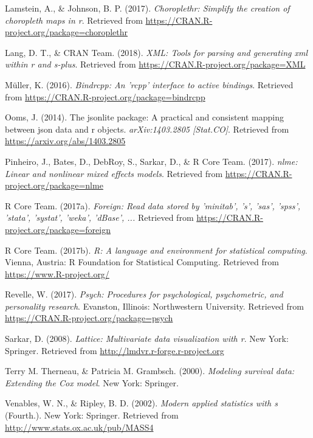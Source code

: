 \documentclass[english,man]{apa6}
\theoremstyle{definition}
\theoremstyle{definition}
\theoremstyle{definition}
\theoremstyle{remark}
\begin{document}
\hypertarget{ref-R-choroplethr}{}
Lamstein, A., \& Johnson, B. P. (2017). \emph{Choroplethr: Simplify the
creation of choropleth maps in r}. Retrieved from
\url{https://CRAN.R-project.org/package=choroplethr}

\hypertarget{ref-R-XML}{}
Lang, D. T., \& CRAN Team. (2018). \emph{XML: Tools for parsing and
generating xml within r and s-plus}. Retrieved from
\url{https://CRAN.R-project.org/package=XML}

\hypertarget{ref-R-bindrcpp}{}
Müller, K. (2016). \emph{Bindrcpp: An 'rcpp' interface to active
bindings}. Retrieved from
\url{https://CRAN.R-project.org/package=bindrcpp}

\hypertarget{ref-R-jsonlite}{}
Ooms, J. (2014). The jsonlite package: A practical and consistent
mapping between json data and r objects. \emph{arXiv:1403.2805
{[}Stat.CO{]}}. Retrieved from \url{https://arxiv.org/abs/1403.2805}

\hypertarget{ref-R-nlme}{}
Pinheiro, J., Bates, D., DebRoy, S., Sarkar, D., \& R Core Team. (2017).
\emph{nlme: Linear and nonlinear mixed effects models}. Retrieved from
\url{https://CRAN.R-project.org/package=nlme}

\hypertarget{ref-R-foreign}{}
R Core Team. (2017a). \emph{Foreign: Read data stored by 'minitab', 's',
'sas', 'spss', 'stata', 'systat', 'weka', 'dBase', ...} Retrieved from
\url{https://CRAN.R-project.org/package=foreign}

\hypertarget{ref-R-base}{}
R Core Team. (2017b). \emph{R: A language and environment for
statistical computing}. Vienna, Austria: R Foundation for Statistical
Computing. Retrieved from \url{https://www.R-project.org/}

\hypertarget{ref-R-psych}{}
Revelle, W. (2017). \emph{Psych: Procedures for psychological,
psychometric, and personality research}. Evanston, Illinois:
Northwestern University. Retrieved from
\url{https://CRAN.R-project.org/package=psych}

\hypertarget{ref-R-lattice}{}
Sarkar, D. (2008). \emph{Lattice: Multivariate data visualization with
r}. New York: Springer. Retrieved from
\url{http://lmdvr.r-forge.r-project.org}

\hypertarget{ref-R-survival-book}{}
Terry M. Therneau, \& Patricia M. Grambsch. (2000). \emph{Modeling
survival data: Extending the Cox model}. New York: Springer.

\hypertarget{ref-R-MASS}{}
Venables, W. N., \& Ripley, B. D. (2002). \emph{Modern applied
statistics with s} (Fourth.). New York: Springer. Retrieved from
\url{http://www.stats.ox.ac.uk/pub/MASS4}
\end{document}
